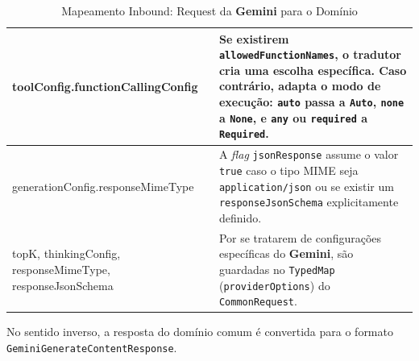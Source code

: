 \begin{table}[H]
\begin{tabularx}{\textwidth}{|>{\ttfamily\raggedright\arraybackslash}p{4.5cm}|Y|}
        toolConfig\newline.functionCallingConfig & Se existirem \texttt{allowedFunctionNames}, o tradutor cria uma escolha específica. Caso contrário, adapta o modo de execução: \texttt{auto} passa a \texttt{Auto}, \texttt{none} a \texttt{None}, e \texttt{any} ou \texttt{required} a \texttt{Required}. \\
        \hline
        generationConfig\newline.responseMimeType & A \textit{flag} \texttt{jsonResponse} assume o valor \texttt{true} caso o tipo MIME seja \texttt{application/json} ou se existir um \texttt{responseJsonSchema} explicitamente definido. \\
        \hline
        topK, thinkingConfig, responseMimeType, responseJsonSchema & Por se tratarem de configurações específicas do \textbf{Gemini}, são guardadas no \texttt{TypedMap} (\texttt{providerOptions}) do \texttt{CommonRequest}. \\
        \hline
    \end{tabularx}
    \caption{Mapeamento Inbound: Request da \textbf{Gemini} para o Domínio}
\end{table}

No sentido inverso, a resposta do domínio comum é convertida para o formato \texttt{Gemini\allowbreak{}Generate\allowbreak{}Content\allowbreak{}Response}.

